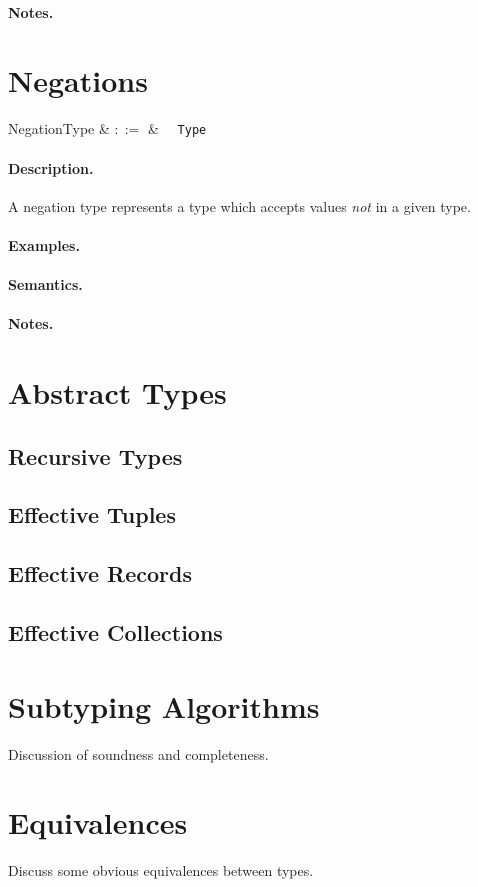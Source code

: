 \paragraph{Notes.}


\section{Negations}

\begin{syntax}
  NegationType & $::=$ & \token{!}\ \ \verb+Type+\\
\end{syntax}

\paragraph{Description.}  A negation type represents a type which
accepts values {\em not} in a given type.

\paragraph{Examples.}

\paragraph{Semantics.}

\paragraph{Notes.}

\section{Abstract Types}
\subsection{Recursive Types}
\subsection{Effective Tuples}
\subsection{Effective Records}
\subsection{Effective Collections}

\section{Subtyping Algorithms}
Discussion of soundness and completeness.

\section{Equivalences}
Discuss some obvious equivalences between types.
